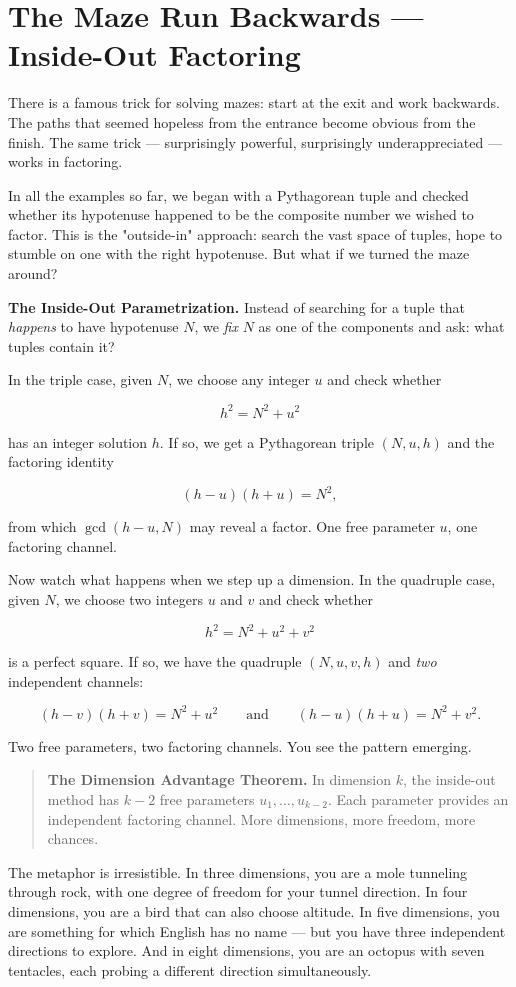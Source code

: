 \documentclass[11pt,twoside,openright]{book}
\theoremstyle{definition}
\theoremstyle{remark}
\begin{document}
\section{The Maze Run Backwards --- Inside-Out Factoring}

There is a famous trick for solving mazes: start at the exit and work backwards. The paths that seemed hopeless from the entrance become obvious from the finish. The same trick --- surprisingly powerful, surprisingly underappreciated --- works in factoring.

In all the examples so far, we began with a Pythagorean tuple and checked whether its hypotenuse happened to be the composite number we wished to factor. This is the "outside-in" approach: search the vast space of tuples, hope to stumble on one with the right hypotenuse. But what if we turned the maze around?

\textbf{The Inside-Out Parametrization.} Instead of searching for a tuple that \textit{happens} to have hypotenuse $N$, we \textit{fix} $N$ as one of the components and ask: what tuples contain it?

In the triple case, given $N$, we choose any integer $u$ and check whether

\[h^2 = N^2 + u^2\]

has an integer solution $h$. If so, we get a Pythagorean triple $(N, u, h)$ and the factoring identity

\[(h - u)(h + u) = N^2,\]

from which $\gcd(h - u, N)$ may reveal a factor. One free parameter $u$, one factoring channel.

Now watch what happens when we step up a dimension. In the quadruple case, given $N$, we choose two integers $u$ and $v$ and check whether

\[h^2 = N^2 + u^2 + v^2\]

is a perfect square. If so, we have the quadruple $(N, u, v, h)$ and \textit{two} independent channels:

\[(h - v)(h + v) = N^2 + u^2 \qquad \text{and} \qquad (h - u)(h + u) = N^2 + v^2.\]

Two free parameters, two factoring channels. You see the pattern emerging.

\begin{quote}
\textbf{The Dimension Advantage Theorem.} In dimension $k$, the inside-out method has $k - 2$ free parameters $u_1, \ldots, u_{k-2}$. Each parameter provides an independent factoring channel. More dimensions, more freedom, more chances.
\end{quote}
The metaphor is irresistible. In three dimensions, you are a mole tunneling through rock, with one degree of freedom for your tunnel direction. In four dimensions, you are a bird that can also choose altitude. In five dimensions, you are something for which English has no name --- but you have three independent directions to explore. And in eight dimensions, you are an octopus with seven tentacles, each probing a different direction simultaneously.
\end{document}
